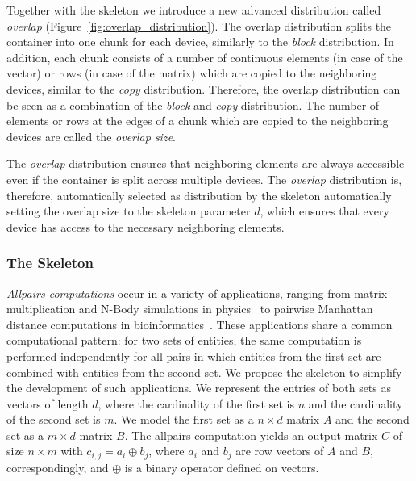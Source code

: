 Together with the \stencil skeleton we introduce a new advanced distribution called \emph{overlap} (Figure~\ref{fig:overlap_distribution}).
The overlap distribution splits the container into one chunk for each device, similarly to the \emph{block} distribution.
In addition, each chunk consists of a number of continuous elements (in case of the vector) or rows (in case of the matrix) which are copied to the neighboring devices, similar to the \emph{copy} distribution.
Therefore, the overlap distribution can be seen as a combination of the \emph{block} and \emph{copy} distribution.
The number of elements or rows at the edges of a chunk which are copied to the neighboring devices are called the \emph{overlap size}.

The \emph{overlap} distribution ensures that neighboring elements are always accessible even if the container is split across multiple devices.
The \emph{overlap} distribution is, therefore, automatically selected as distribution by the \stencil skeleton automatically setting the overlap size to the skeleton parameter $d$, which ensures that every device has access to the necessary neighboring elements.





\subsubsection{The \allpairs Skeleton}
\label{sec:allpairs_skeleton}

\emph{Allpairs computations} occur in a variety of applications, ranging from matrix multiplication and N-Body simulations in physics~\cite{AroraShVu2009} to pairwise Manhattan distance computations in bioinformatics~\cite{ChangDeQuRo2009}.
These applications share a common computational pattern:
for two sets of entities, the same computation is performed independently for all pairs in which entities from the first set are combined with entities from the second set.
We propose the \allpairs skeleton to simplify the development of such applications.
We represent the entries of both sets as vectors of length $d$, where the cardinality of the first set is $n$ and the cardinality of the second set is $m$.
We model the first set as a $n\times d$ matrix $A$ and the second set as a $m\times d$ matrix $B$.
The allpairs computation yields an output matrix $C$ of size $n\times m$ with $c_{i, j} = a_i \oplus b_j$, where $a_i$ and $b_j$ are row vectors of $A$ and $B$, correspondingly,
and $\oplus$ is a binary operator defined on vectors.


